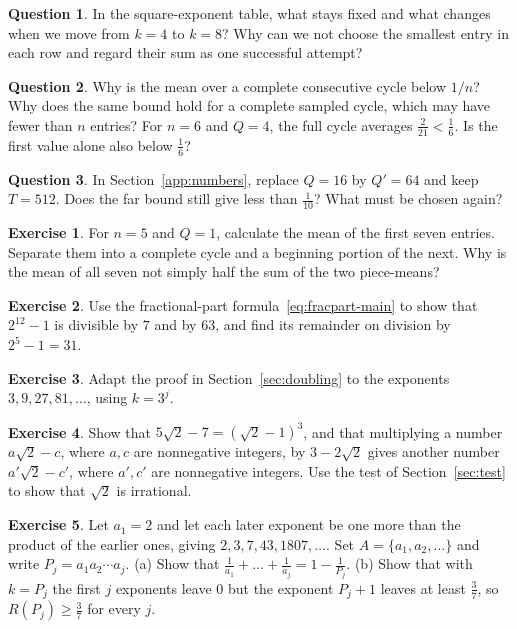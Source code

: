 \documentclass[10pt]{article}
\theoremstyle{plain}
\theoremstyle{definition}
\newtheorem{exercise}{Exercise}
\newtheorem{readercheck}{Question}
\theoremstyle{remark}
\begin{document}
\begin{readercheck}\label{chk:columns}
In the square-exponent table, what stays fixed and what changes when we
move from $k=4$ to $k=8$? Why can we not choose the smallest entry in each
row and regard their sum as one successful attempt?
\end{readercheck}

\begin{readercheck}\label{chk:partial}
Why is the mean over a complete consecutive cycle below $1/n$? Why
does the same bound hold for a complete sampled cycle, which may have fewer
than $n$ entries? For $n=6$ and $Q=4$, the full cycle averages
$\tfrac2{21}<\tfrac16$. Is the first value alone also below $\tfrac16$?
\end{readercheck}

\begin{readercheck}\label{chk:order}
In Section~\ref{app:numbers}, replace $Q=16$ by $Q'=64$ and keep
$T=512$. Does the far bound still give less than $\tfrac1{10}$? What must
be chosen again?
\end{readercheck}

\begin{exercise}\label{ex:2}
For $n=5$ and $Q=1$, calculate the mean of the first seven entries.
Separate them into a complete cycle and a beginning portion of the next.
Why is the mean of all seven not simply half the sum of the two piece-means?
\end{exercise}

\begin{exercise}\label{ex:3}
Use the fractional-part formula~\eqref{eq:fracpart-main} to show that $2^{12}-1$ is divisible by $7$ and
by $63$, and find its remainder on division by $2^5-1=31$.
\end{exercise}

\begin{exercise}\label{ex:4}
Adapt the proof in Section~\ref{sec:doubling} to the exponents
$3,9,27,81,\dots$, using $k=3^j$.
\end{exercise}

\begin{exercise}\label{ex:5}
Show that $5\sqrt2-7=(\sqrt2-1)^3$, and that multiplying a number
$a\sqrt2-c$, where $a,c$ are nonnegative integers, by $3-2\sqrt2$ gives
another number $a'\sqrt2-c'$, where $a',c'$ are nonnegative integers. Use the test of
Section~\ref{sec:test} to show that $\sqrt2$ is irrational.
\end{exercise}

\begin{exercise}\label{ex:6}
Let $a_1=2$ and let each later exponent be one more than the product of the
earlier ones, giving $2,3,7,43,1807,\dots$. Set $A=\{a_1,a_2,\dots\}$
and write $P_j=a_1a_2\cdots a_j$.
(a) Show that $\tfrac1{a_1}+\dots+\tfrac1{a_j}=1-\tfrac1{P_j}$. (b) Show that
with $k=P_j$ the first $j$ exponents leave $0$ but the exponent $P_j+1$ leaves at
least $\tfrac37$, so $R(P_j)\ge\tfrac37$ for every $j$.
\end{exercise}
\end{document}
